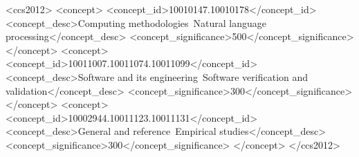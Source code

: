 \documentclass[sigconf,authordraft]{acmart}
\begin{document}
\begin{CCSXML}
<ccs2012>
 <concept>
  <concept_id>10010147.10010178</concept_id>
  <concept_desc>Computing methodologies~Natural language processing</concept_desc>
  <concept_significance>500</concept_significance>
 </concept>
 <concept>
  <concept_id>10011007.10011074.10011099</concept_id>
  <concept_desc>Software and its engineering~Software verification and validation</concept_desc>
  <concept_significance>300</concept_significance>
 </concept>
 <concept>
  <concept_id>10002944.10011123.10011131</concept_id>
  <concept_desc>General and reference~Empirical studies</concept_desc>
  <concept_significance>300</concept_significance>
 </concept>
</ccs2012>
\end{CCSXML}




\end{document}
